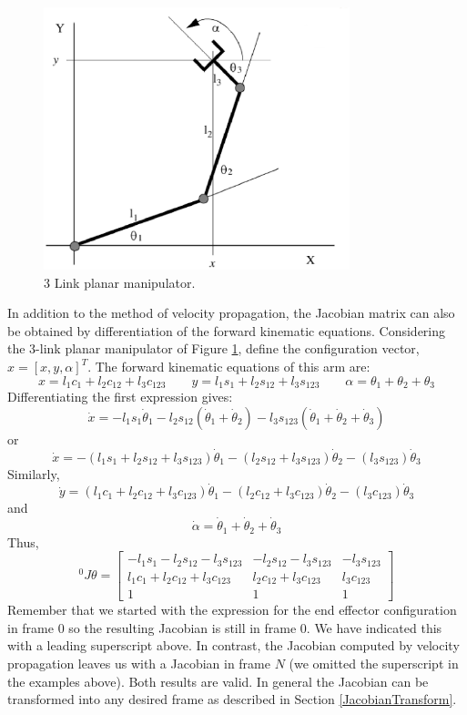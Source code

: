 \begin{figure}
\includegraphics[width=3.5in]{figs05/planar_3link.eps}
\caption{3 Link planar manipulator.}\label{planar3link}
\end{figure}

In addition to the method of velocity propagation, the Jacobian matrix can also be obtained by differentiation of the forward kinematic equations.
Considering the 3-link planar manipulator of Figure \ref{planar3link}, define the configuration vector, $x = [x,y,\alpha]^T$.   The forward kinematic equations of this arm are:
\[
x = l_1c_1+l_2c_{12}+l_3c_{123} \qquad y =  l_1s_1+l_2s_{12}+l_3s_{123}  \qquad \alpha = \theta_1 + \theta_2+\theta_3
\]
Differentiating the first expression gives:
\[
\dot{x} = -l_1s_1\dot{\theta}_1-l_2s_{12}(\dot{\theta}_1+\dot{\theta}_2)-l_3s_{123}(\dot{\theta}_1+\dot{\theta}_2+\dot{\theta}_3)
\]
or
\[
\dot{x} = -(l_1s_1+l_2s_{12}+l_3s_{123})\dot{\theta}_1 - (l_2s_{12}+l_3s_{123})\dot{\theta}_2 - (l_3s_{123})\dot{\theta}_3
\]
Similarly,
\[
\dot{y} = (l_1c_1+l_2c_{12}+l_3c_{123})\dot{\theta}_1 - (l_2c_{12}+l_3c_{123})\dot{\theta}_2 - (l_3c_{123})\dot{\theta}_3
\]
and
\[
\dot{\alpha} = \dot{\theta}_1 + \dot{\theta}_2 + \dot{\theta}_3
\]
Thus,
\[
^0J{\theta} =
\left [ \begin{array}{ccc}
-l_1s_1-l_2s_{12}-l_3s_{123}    & -l_2s_{12}-l_3s_{123}  &  -l_3s_{123}   \\
l_1c_1+l_2c_{12}+l_3c_{123}     & l_2c_{12}+l_3c_{123}   & l_3c_{123}     \\
1 & 1 & 1
\end{array} \right ]
\]
Remember that we started with the expression for the end effector configuration in frame 0 so the resulting Jacobian is still in frame 0.  We have indicated this with a leading superscript above.   In contrast, the Jacobian computed by velocity propagation leaves us with a Jacobian in frame $N$ (we omitted the superscript in the examples above).  Both results are valid.  In general the Jacobian can be transformed into any desired frame as described in Section \ref{JacobianTransform}.


